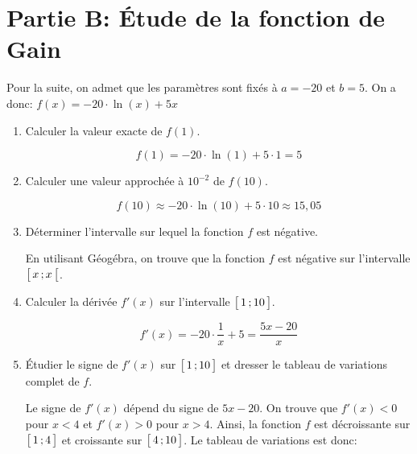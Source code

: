 \documentclass[11pt, a4paper]{report}
\begin{document}
\section*{Partie B\@: Étude de la fonction de Gain}

Pour la suite, on admet que les paramètres sont fixés à $a = -20$ et $b = 5$. On a donc:
$f(x) = -20 \cdot \ln(x) + 5x$

\medskip

\begin{enumerate}[resume]
    \item Calculer la valeur exacte de $f(1)$.
    \begin{blocvisible}[height=1]
        \[f(1) = -20 \cdot \ln(1) + 5 \cdot 1 = 5\]
    \end{blocvisible}
    \medskip
\item Calculer une valeur approchée à $10^{-2}$ de $f(10)$.
    \begin{blocvisible}[height=1]
        \[f(10) \approx -20 \cdot \ln(10) + 5 \cdot 10 \approx 15,05\]
    \end{blocvisible}
    \medskip
\item Déterminer l'intervalle sur lequel la fonction $f$ est négative.
    \begin{blocvisible}[height=1]
        En utilisant Géogébra, on trouve que la fonction $f$ est négative sur l'intervalle $\bigl[ \, x \, ; x \,\bigl[$.
    \end{blocvisible}
    \medskip
\item Calculer la dérivée $f'(x)$ sur l'intervalle $\bigl[ \, 1 \, ; 10 \,\bigl]$.
    \begin{blocvisible}[height=1.5]
\[f'(x) = -20 \cdot \frac{1}{x} + 5 = \dfrac{5x - 20}{x}\]
    \end{blocvisible}

        \pagebreak

    \item Étudier le signe de $f'(x)$ sur $\bigl[ \, 1 \, ; 10 \,\bigl]$ et dresser le tableau de variations complet de $f$.
    \begin{blocvisible}[height=4.5]
        \begin{minipage}{0.54\linewidth}
        Le signe de $f'(x)$ dépend du signe de $5x - 20$. On trouve que $f'(x) < 0$ pour $x < 4$ et $f'(x) > 0$ pour $x > 4$. Ainsi, la fonction $f$ est décroissante sur $\bigl[ \, 1 \, ; 4 \,\bigl]$ et croissante sur $\bigl[ \, 4 \, ; 10 \,\bigl]$. Le tableau de variations est donc:
        \end{minipage}\hfill
        \begin{minipage}{0.45\linewidth}
        \end{minipage}
    \end{blocvisible}
    
\end{enumerate}
    
\end{document}
